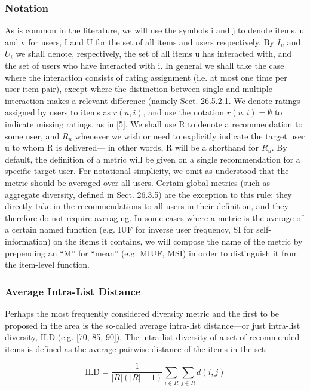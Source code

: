 \subsubsection{Notation}

As is common in the literature, we will use the symbols i and j to denote items, u and v for users, I and U for the set of all items and users respectively. By $I_u$ and $U_i$ we shall denote, respectively, the set of all items u has interacted with, and the set of users who have interacted with i. In general we shall take the case where the interaction consists of rating assignment (i.e. at most one time per user-item pair), except where the distinction between single and multiple interaction makes a relevant difference (namely Sect. 26.5.2.1. We denote ratings assigned by users to items as $r ( u , i )$, and use the notation $r ( u , i ) = \emptyset$ to indicate missing ratings, as in [5]. We shall use R to denote a recommendation to some user, and $R_u$ whenever we wish or need to explicitly indicate the target user u to whom R is delivered— in other words, R will be a shorthand for $R_u$. By default, the definition of a metric will be given on a single recommendation for a specific target user. For notational simplicity, we omit as understood that the metric should be averaged over all users. Certain global metrics (such as aggregate diversity, defined in Sect. 26.3.5) are the exception to this rule: they directly take in the recommendations to all users in their definition, and they therefore do not require averaging. In some cases where a metric is the average of a certain named function (e.g. IUF for inverse user frequency, SI for self-information) on the items it contains, we will compose the name of the metric by prepending an “M” for “mean” (e.g. MIUF, MSI) in order to distinguish it from the item-level function.

\subsubsection{Average Intra-List Distance}

Perhaps the most frequently considered diversity metric and the first to be proposed in the area is the so-called average intra-list distance—or just intra-list diversity, ILD (e.g. [70, 85, 90]). The intra-list diversity of a set of recommended items is defined as the average pairwise distance of the items in the set:

$$\mathrm { ILD } = \frac { 1 } { | R | ( | R | - 1 ) } \sum _ { i \in R } \sum _ { j \in R } d ( i , j )$$


